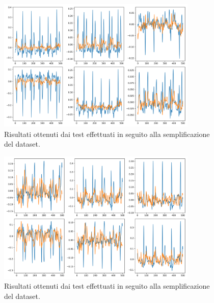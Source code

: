 \documentclass[12pt,italian]{report}
\begin{document}
\begin{figure}[H]
    \centering
    \includegraphics[width=0.85\textwidth]{immagini/prima_cnn_risultati_secondo_plot_0.png}
    \captionsetup{justification=centering}
    \caption{Risultati ottenuti dai test effettuati in seguito alla semplificazione del dataset.}
    \label{fig:prima_cnn_risultati_secondo_plot_0}
\end{figure}
\begin{figure}[H]
    \centering
    \includegraphics[width=0.85\textwidth]{immagini/prima_cnn_risultati_secondo_plot_1.png}
    \captionsetup{justification=centering}
    \caption{Risultati ottenuti dai test effettuati in seguito alla semplificazione del dataset.}
    \label{fig:prima_cnn_risultati_secondo_plot_1}
\end{figure}
\end{document}
